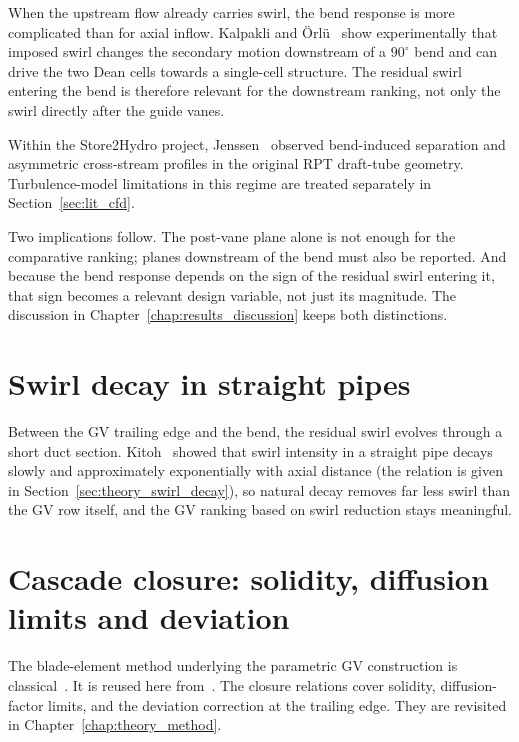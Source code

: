 When the upstream flow already carries swirl, the bend response is more complicated than for axial inflow. Kalpakli and \"Orl\"u~\cite{KalpakliOrlu2013} show experimentally that imposed swirl changes the secondary motion downstream of a \(90^\circ\) bend and can drive the two Dean cells towards a single-cell structure. The residual swirl entering the bend is therefore relevant for the downstream ranking, not only the swirl directly after the guide vanes.
 
Within the Store2Hydro project, Jenssen~\cite{Jenssen2020} observed bend-induced separation and asymmetric cross-stream profiles in the original RPT draft-tube geometry. Turbulence-model limitations in this regime are treated separately in Section~\ref{sec:lit_cfd}.
 
Two implications follow. The post-vane plane alone is not enough for the comparative ranking; planes downstream of the bend must also be reported. And because the bend response depends on the sign of the residual swirl entering it, that sign becomes a relevant design variable, not just its magnitude. The discussion in Chapter~\ref{chap:results_discussion} keeps both distinctions.
 
\section{Swirl decay in straight pipes}
\label{sec:lit_swirl_decay}

Between the GV trailing edge and the bend, the residual swirl evolves through a short duct section. Kitoh~\cite{Kitoh1991} showed that swirl intensity in a straight pipe decays slowly and approximately exponentially with axial distance (the relation is given in Section~\ref{sec:theory_swirl_decay}), so natural decay removes far less swirl than the GV row itself, and the GV ranking based on swirl reduction stays meaningful.
 
\section{Cascade closure: solidity, diffusion limits and deviation}
\label{sec:lit_cascade}
 
The blade-element method underlying the parametric GV construction is classical~\cite{Wallis1968}. It is reused here from~\cite{Leonsen2025}. The closure relations cover solidity, diffusion-factor limits, and the deviation correction at the trailing edge. They are revisited in Chapter~\ref{chap:theory_method}.
 
